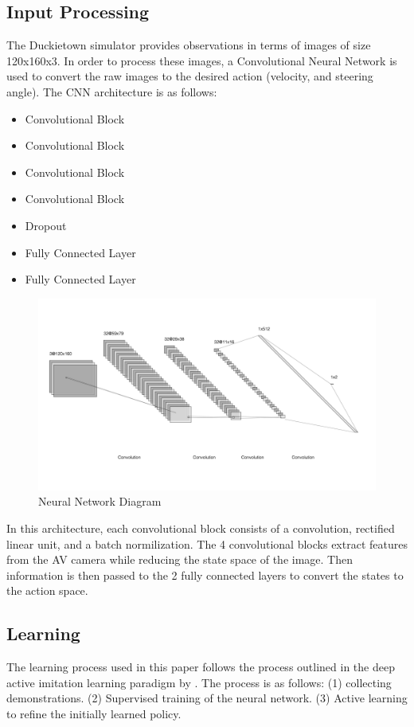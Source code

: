 \documentclass[conference]{IEEEtran}
\begin{document}
\subsection{Input Processing}
The Duckietown simulator provides observations in terms of images of size 120x160x3. In order to 
process these images, a Convolutional Neural Network is used to convert the raw images to the 
desired action (velocity, and steering angle).
The CNN architecture is as follows: 
\begin{itemize}
  \item Convolutional Block 
  \item Convolutional Block 
  \item Convolutional Block 
  \item Convolutional Block 
  \item Dropout
  \item Fully Connected Layer
  \item Fully Connected Layer
\end{itemize}
\begin{figure}[H]
  \centering
    \includegraphics[scale=0.20]{neural_net.png}
  \caption{Neural Network Diagram}
\end{figure}
In this architecture, each convolutional block consists of a convolution, rectified linear unit, and
a batch normilization. The 4 convolutional blocks extract features from the AV camera while reducing
the state space of the image. Then information is then passed to the 2 fully connected layers to convert 
the states to the action space. 

\subsection{Learning}
The learning process used in this paper follows the process outlined in the deep active imitation
learning paradigm by \citet{deepImitation}. The process is as follows: (1) collecting demonstrations. 
(2) Supervised training of the neural network. (3) Active learning to refine the initially learned policy.
\end{document}
